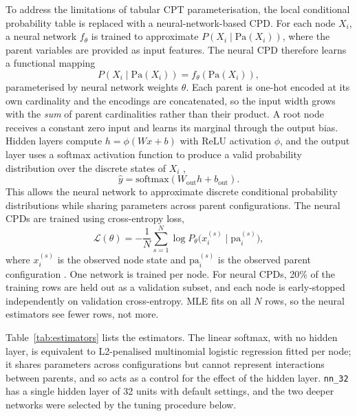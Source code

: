 \documentclass[a4paper,fleqn]{cas-dc}
\newcommand{\Pa}{\mathrm{Pa}}
\begin{document}
To address the limitations of tabular CPT parameterisation, the local conditional probability table is replaced with a neural-network-based CPD. For each node $X_i$, a neural network $f_\theta$ is trained to approximate $P(X_i\mid\Pa(X_i))$, where the parent variables are provided as input features. The neural CPD therefore learns a functional mapping
\begin{equation*}
P(X_i\mid\Pa(X_i))=f_\theta(\Pa(X_i)),
\end{equation*}
parameterised by neural network weights $\theta$. Each parent is one-hot encoded at its own cardinality and the encodings are concatenated, so the input width grows with the \emph{sum} of parent cardinalities rather than their product. A root node receives a constant zero input and learns its marginal through the output bias. Hidden layers compute $h=\phi(Wx+b)$ with ReLU activation $\phi$, and the output layer uses a softmax activation function to produce a valid probability distribution over the discrete states of $X_i$ \citep[Sec.~6.2.2.3]{goodfellow2016deep},
\begin{equation*}
\hat{y}=\mathrm{softmax}(W_{\mathrm{out}}h+b_{\mathrm{out}}).
\end{equation*}
This allows the neural network to approximate discrete conditional probability distributions while sharing parameters across parent configurations. The neural CPDs are trained using cross-entropy loss,
\begin{equation*}
\mathcal{L}(\theta)=-\frac{1}{N}\sum_{s=1}^{N}\log P_\theta\big(x_i^{(s)} \mid \mathrm{pa}_i^{(s)}\big),
\end{equation*}
where $x_i^{(s)}$ is the observed node state and $\mathrm{pa}_i^{(s)}$ is the observed parent configuration \citep[Sec.~6.2.1.1]{goodfellow2016deep}. One network is trained per node. For neural CPDs, 20\% of the training rows are held out as a validation subset, and each node is early-stopped independently on validation cross-entropy. MLE fits on all $N$ rows, so the neural estimators see fewer rows, not more.

Table~\ref{tab:estimators} lists the estimators. The linear softmax, with no hidden layer, is equivalent to L2-penalised multinomial logistic regression fitted per node; it shares parameters across configurations but cannot represent interactions between parents, and so acts as a control for the effect of the hidden layer. \texttt{nn\_32} has a single hidden layer of 32 units with default settings, and the two deeper networks were selected by the tuning procedure below.
\end{document}
